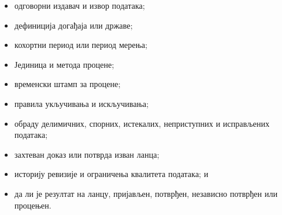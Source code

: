 \documentclass[11pt]{article}
\begin{document}
\begin{itemize}[leftmargin=*]
\item одговорни издавач и извор података;
\item дефиниција догађаја или државе;
\item кохортни период или период мерења;
\item Јединица и метода процене;
\item временски штамп за процене;
\item правила укључивања и искључивања;
\item обраду делимичних, спорних, истекалих, неприступних и исправљених података;
\item захтеван доказ или потврда изван ланца;
\item историју ревизије и ограничења квалитета података; и
\item да ли је резултат на ланцу, пријављен, потврђен, независно потврђен или процењен.
\end{itemize}
\end{document}

